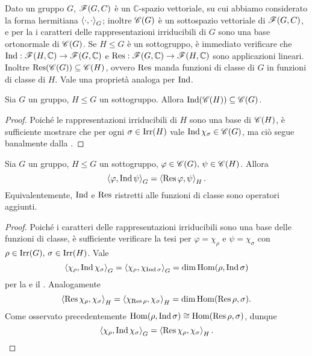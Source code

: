 Dato un gruppo $G$, $\mathscr{F}(G,C)$ è un $\mathbb{C}$-spazio vettoriale, su cui abbiamo considerato la forma hermitiana $\left\langle\cdot,\cdot\right\rangle_G$; inoltre $\mathscr{C}(G)$ è un sottospazio vettoriale di $\mathscr{F}(G,C)$, e per la  i caratteri delle rappresentazioni irriducibili di $G$ sono una base ortonormale di $\mathscr{C}(G)$. Se $H\le G$ è un sottogruppo, è immediato verificare che $\operatorname{Ind}:\mathscr{F}(H,\mathbb{C})\to\mathscr{F}(G,\mathbb{C})$ e $\operatorname{Res}:\mathscr{F}(G,\mathbb{C})\to\mathscr{F}(H,\mathbb{C})$ sono applicazioni lineari. Inoltre $\operatorname{Res}(\mathscr{C}(G))\subseteq\mathscr{C}(H)$, ovvero $\operatorname{Res}$ manda funzioni di classe di $G$ in funzioni di classe di $H$. Vale una proprietà analoga per $\operatorname{Ind}$.

\begin{proposition}
Sia $G$ un gruppo, $H\le G$ un sottogruppo. Allora $\operatorname{Ind}(\mathscr{C}(H))\subseteq\mathscr{C}(G)$.
\end{proposition}
\begin{proof}
Poiché le rappresentazioni irriducibili di $H$ sono una base di $\mathscr{C}(H)$, è sufficiente mostrare che per ogni $\sigma\in\operatorname{Irr}(H)$ vale $\operatorname{Ind}\chi_\sigma\in\mathscr{C}(G)$, ma ciò segue banalmente dalla .
\end{proof}

\begin{proposition}
Sia $G$ un gruppo, $H\le G$ un sottogruppo, $\varphi\in\mathscr{C}(G),\,\allowbreak\psi\in\mathscr{C}(H)$. Allora
$$
\left\langle\varphi,\operatorname{Ind}\psi\right\rangle_G=\left\langle\operatorname{Res}\varphi,\psi\right\rangle_H.
$$
Equivalentemente, $\operatorname{Ind}$ e $\operatorname{Res}$ ristretti alle funzioni di classe sono operatori aggiunti.
\end{proposition}
\begin{proof}
Poiché i caratteri delle rappresentazioni irriducibili sono una base delle funzioni di classe, è sufficiente verificare la tesi per $\varphi=\chi_\rho$ e $\psi=\chi_\sigma$ con $\rho\in\operatorname{Irr}(G),\,\allowbreak\sigma\in\operatorname{Irr}(H)$. Vale
$$
\left\langle\chi_\rho,\operatorname{Ind}\chi_\sigma\right\rangle_G=\left\langle\chi_\rho,\chi_{\operatorname{Ind}\sigma}\right\rangle_G=\dim\operatorname{Hom}(\rho,\operatorname{Ind}\sigma)
$$
per la  e il . Analogamente
$$
\left\langle\operatorname{Res}\chi_\rho,\chi_\sigma\right\rangle_H=\left\langle\chi_{\operatorname{Res}\rho},\chi_\sigma\right\rangle_H=\dim\operatorname{Hom}(\operatorname{Res}\rho,\sigma).
$$
Come osservato precedentemente $\operatorname{Hom}(\rho,\operatorname{Ind}\sigma)\cong\operatorname{Hom}(\operatorname{Res}\rho,\sigma)$, dunque
$$
\left\langle\chi_\rho,\operatorname{Ind}\chi_\sigma\right\rangle_G=\left\langle\operatorname{Res}\chi_\rho,\chi_\sigma\right\rangle_H.
$$
\end{proof}

